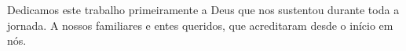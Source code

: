 \begin{dedicatoria}[DEDICATÓRIA]
Dedicamos este trabalho primeiramente a Deus que nos sustentou durante toda a jornada. A nossos familiares e entes queridos, que acreditaram desde o início em nós.
\end{dedicatoria}